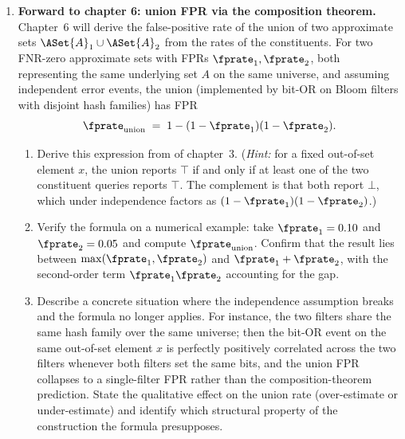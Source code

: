 \begin{enumerate}
\item \exstarstarstar
\label{ex:ch5-11}
\textbf{Forward to chapter 6: union FPR via the composition theorem.}
Chapter~6 will derive the false-positive rate of the union of two
approximate sets $\ASet{A}_1 \cup \ASet{A}_2$ from the rates of the
constituents. For two FNR-zero approximate sets with FPRs
$\fprate_1, \fprate_2$, both representing the same underlying set $A$
on the same universe, and assuming independent error events, the
union (implemented by bit-OR on Bloom filters with disjoint hash
families) has FPR
\[
  \fprate_{\text{union}} \;=\; 1 - (1 - \fprate_1)(1 - \fprate_2).
\]
\begin{enumerate}
  \item[(a)] Derive this expression from  of
    chapter~3. (\emph{Hint:} for a fixed out-of-set element $x$, the
    union reports $\top$ if and only if at least one of the two
    constituent queries reports $\top$. The complement is that both
    report $\bot$, which under independence factors as $(1 -
    \fprate_1)(1 - \fprate_2)$.)
  \item[(b)] Verify the formula on a numerical example: take
    $\fprate_1 = 0.10$ and $\fprate_2 = 0.05$ and compute
    $\fprate_{\text{union}}$. Confirm that the result lies between
    $\max(\fprate_1, \fprate_2)$ and $\fprate_1 + \fprate_2$, with
    the second-order term $\fprate_1 \fprate_2$ accounting for the
    gap.
  \item[(c)] Describe a concrete situation where the independence
    assumption breaks and the formula no longer applies. For
    instance, the two filters share the same hash family over the
    same universe; then the bit-OR event on the same out-of-set
    element $x$ is perfectly positively correlated across the two
    filters whenever both filters set the same bits, and the union
    FPR collapses to a single-filter FPR rather than the
    composition-theorem prediction. State the qualitative effect on
    the union rate (over-estimate or under-estimate) and identify
    which structural property of the construction the formula
    presupposes.
\end{enumerate}

\end{enumerate}

